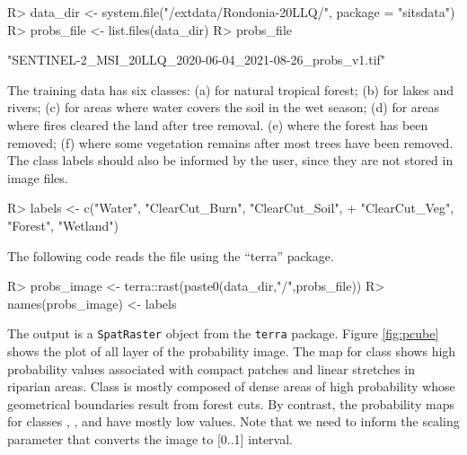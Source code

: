 \documentclass[
  shortnames]{jss}
\begin{document}
\begin{CodeChunk}
\begin{CodeInput}
R> data_dir <- system.file("/extdata/Rondonia-20LLQ/", package = "sitsdata")
R> probs_file <- list.files(data_dir)
R> probs_file
\end{CodeInput}
\begin{CodeOutput}
[1] "SENTINEL-2_MSI_20LLQ_2020-06-04_2021-08-26_probs_v1.tif"
\end{CodeOutput}
\end{CodeChunk}

The training data has six classes: (a)  for natural tropical forest; (b)  for lakes and rivers; (c)  for areas where water covers the soil in the wet season; (d)  for areas where fires cleared the land after tree removal. (e)  where the forest has been removed; (f)  where some vegetation remains after most trees have been removed. The class labels should also be informed by the user, since they are not stored in image files.

\begin{CodeChunk}
\begin{CodeInput}
R> labels <- c("Water", "ClearCut_Burn", "ClearCut_Soil",
+             "ClearCut_Veg", "Forest", "Wetland")
\end{CodeInput}
\end{CodeChunk}

The following code reads the file using the ``terra'' package.

\begin{CodeChunk}
\begin{CodeInput}
R> probs_image <- terra::rast(paste0(data_dir,"/",probs_file))
R> names(probs_image) <- labels
\end{CodeInput}
\end{CodeChunk}

The output is a \texttt{SpatRaster} object from the \texttt{terra} package. Figure \ref{fig:pcube} shows the plot of all layer of the probability image. The map for class  shows high probability values associated with compact patches and linear stretches in riparian areas. Class  is mostly composed of dense areas of high probability whose geometrical boundaries result from forest cuts. By contrast, the probability maps for classes , , and  have mostly low values. Note that we need to inform the scaling parameter that converts the image to {[}0..1{]} interval.
\end{document}
